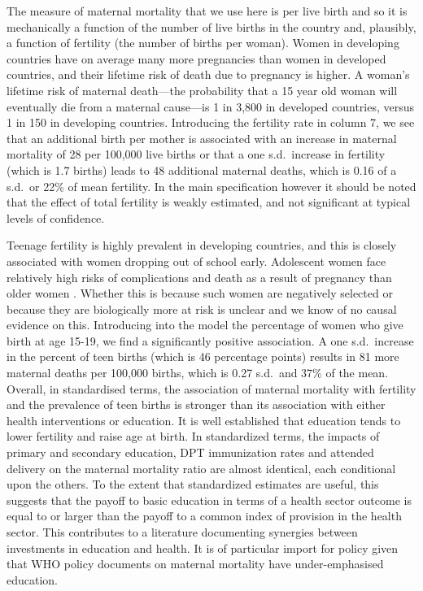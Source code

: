 \documentclass{article}[12pt,subeqn]
\begin{document}
\begin{spacing}{1.4}
The measure of maternal mortality that we use here is per live birth and so it is mechanically a function
of the number of live births in the country and, plausibly, a function of fertility (the number of births
per woman). Women in developing countries have on average many more pregnancies than women in developed 
countries, and their lifetime risk of death due to pregnancy is higher. A woman's lifetime risk
of maternal death---the probability that a 15 year old woman will eventually die from a maternal cause---is
1 in 3,800 in developed countries, versus 1 in 150 in developing countries. Introducing the fertility rate in
column 7, we see that an additional birth per mother is associated with an increase in maternal mortality of
28 per 100,000 live births or that a one s.d.\ increase in fertility (which is 1.7 births) leads to 48 additional
maternal deaths, which is 0.16 of a s.d.\ or 22\% of mean fertility. In the main specification however it
should be noted that the effect of total fertility is weakly estimated, and not significant at typical levels of
confidence.

Teenage fertility is highly prevalent in developing countries, and this is closely associated with women
dropping out of school early. Adolescent women face relatively high risks of complications and death as
a result of pregnancy than older women \citep{Condeetal2005, Pattonetal2009}.  Whether this is because such 
women are negatively selected or because they are biologically more at risk is unclear and we know of no causal 
evidence on this. Introducing into the model the percentage of women who give birth at age 15-19, we find a 
significantly positive association. A one s.d.\ increase in the percent of teen births (which is 46 percentage 
points) results in 81 more maternal deaths per 100,000 births, which is 0.27 s.d.\ and 37\% of the mean. Overall, 
in standardised terms, the association of maternal mortality with fertility and the prevalence of teen births is 
stronger than its association with either health interventions or education. It is well established that education 
tends to lower fertility and raise age at birth.  In standardized terms, the impacts of primary and secondary 
education, DPT immunization rates and attended delivery on the maternal mortality ratio are almost identical, 
each conditional upon the others. To the extent that standardized estimates are useful, this suggests that the 
payoff to basic education in terms of a health sector outcome is equal to or larger than the payoff to a common 
index of provision in the health sector. This contributes to a literature documenting synergies between investments 
in education and health.  It is of particular import for policy given that WHO policy documents on maternal 
mortality have under-emphasised education.


\end{spacing}
\end{document}
